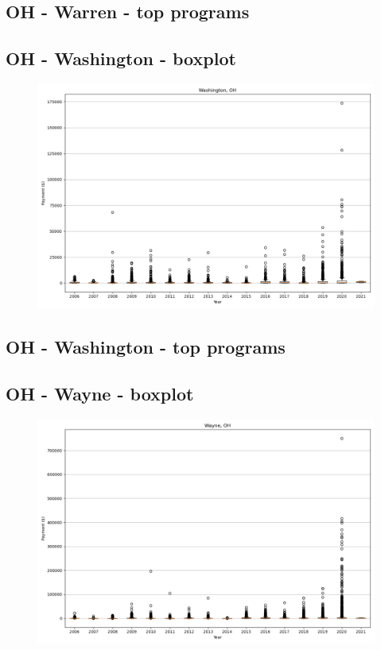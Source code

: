 \subsection*{OH - Warren - top programs}

\newpage
\subsection*{OH - Washington - boxplot}
\begin{figure}[h]
\centering
\includegraphics[width=7in]{../output/boxplots/counties/Washington-OH_boxplot.png}
\end{figure}


\subsection*{OH - Washington - top programs}

\newpage
\subsection*{OH - Wayne - boxplot}
\begin{figure}[h]
\centering
\includegraphics[width=7in]{../output/boxplots/counties/Wayne-OH_boxplot.png}
\end{figure}



